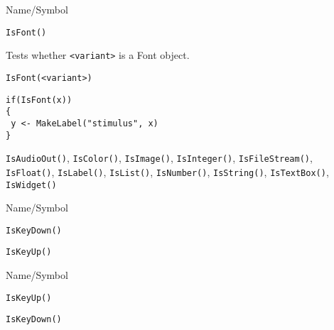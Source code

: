 \rl




\begin{desc}{Name/Symbol}
\item[Name/Symbol]	\verb+IsFont()+

\item[Description]	Tests whether \verb+<variant>+ is a Font object.

\item[Usage]
\begin{verbatim}
IsFont(<variant>)
\end{verbatim}

\item[Example]	
\begin{verbatim}
if(IsFont(x))
{
 y <- MakeLabel("stimulus", x)
}
\end{verbatim}

\item[See Also] \verb+IsAudioOut()+, \verb+IsColor()+,
  \verb+IsImage()+, \verb+IsInteger()+, \verb+IsFileStream()+,
  \verb+IsFloat()+, \verb+IsLabel()+, \verb+IsList()+,
  \verb+IsNumber()+, \verb+IsString()+, \verb+IsTextBox()+,
  \verb+IsWidget()+
\end{desc}

\rl




\begin{desc}{Name/Symbol}
\item[Name/Symbol]	\verb+IsKeyDown()+

\item[Description]	

\item[Usage]		

\item[Example]	

\item[See Also]	\verb+IsKeyUp()+
\end{desc}

\rl


\begin{desc}{Name/Symbol}
\item[Name/Symbol]	\verb+IsKeyUp()+

\item[Description]	

\item[Usage]		

\item[Example]	

\item[See Also]	\verb+IsKeyDown()+
\end{desc}

